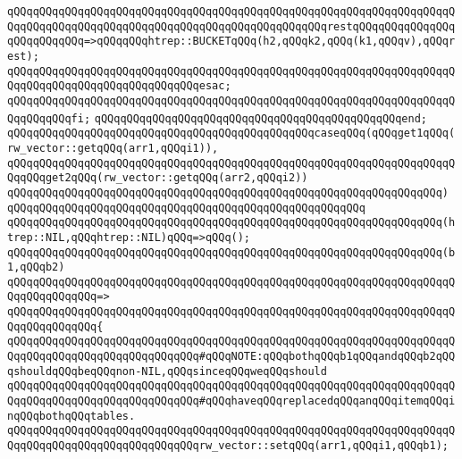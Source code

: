 \verb|qQQqqQQqqQQqqQQqqQQqqQQqqQQqqQQqqQQqqQQqqQQqqQQqqQQqqQQqqQQqqQQqqQQqqQQqqQQqqQQqqQQqqQQqqQQqqQQqqQQqqQQqqQQqqQQqqQQqqQQqrestqQQqqQQqqQQqqQQqqQQqqQQqqQQq=>qQQqqQQqhtrep::BUCKETqQQq(h2,qQQqk2,qQQq(k1,qQQqv),qQQqrest);|\newline
\verb|qQQqqQQqqQQqqQQqqQQqqQQqqQQqqQQqqQQqqQQqqQQqqQQqqQQqqQQqqQQqqQQqqQQqqQQqqQQqqQQqqQQqqQQqqQQqqQQqqQQqesac;|\newline
\verb|qQQqqQQqqQQqqQQqqQQqqQQqqQQqqQQqqQQqqQQqqQQqqQQqqQQqqQQqqQQqqQQqqQQqqQQqqQQqqQQqfi;|\newline
\verb|qQQqqQQqqQQqqQQqqQQqqQQqqQQqqQQqqQQqqQQqqQQqqQQqend;|\newline
\newline
\verb|qQQqqQQqqQQqqQQqqQQqqQQqqQQqqQQqqQQqqQQqqQQqqQQqcaseqQQq(qQQqget1qQQq(rw_vector::getqQQq(arr1,qQQqi1)),|\newline
\verb|qQQqqQQqqQQqqQQqqQQqqQQqqQQqqQQqqQQqqQQqqQQqqQQqqQQqqQQqqQQqqQQqqQQqqQQqqQQqget2qQQq(rw_vector::getqQQq(arr2,qQQqi2))|\newline
\verb|qQQqqQQqqQQqqQQqqQQqqQQqqQQqqQQqqQQqqQQqqQQqqQQqqQQqqQQqqQQqqQQqqQQq)|\newline
\verb|qQQqqQQqqQQqqQQqqQQqqQQqqQQqqQQqqQQqqQQqqQQqqQQqqQQqqQQq|\newline
\verb|qQQqqQQqqQQqqQQqqQQqqQQqqQQqqQQqqQQqqQQqqQQqqQQqqQQqqQQqqQQqqQQqqQQq(htrep::NIL,qQQqhtrep::NIL)qQQq=>qQQq();|\newline
\newline
\verb|qQQqqQQqqQQqqQQqqQQqqQQqqQQqqQQqqQQqqQQqqQQqqQQqqQQqqQQqqQQqqQQqqQQq(b1,qQQqb2)|\newline
\verb|qQQqqQQqqQQqqQQqqQQqqQQqqQQqqQQqqQQqqQQqqQQqqQQqqQQqqQQqqQQqqQQqqQQqqQQqqQQqqQQqqQQq=>|\newline
\verb|qQQqqQQqqQQqqQQqqQQqqQQqqQQqqQQqqQQqqQQqqQQqqQQqqQQqqQQqqQQqqQQqqQQqqQQqqQQqqQQqqQQq{|\newline
\verb|qQQqqQQqqQQqqQQqqQQqqQQqqQQqqQQqqQQqqQQqqQQqqQQqqQQqqQQqqQQqqQQqqQQqqQQqqQQqqQQqqQQqqQQqqQQqqQQqqQQq#qQQqNOTE:qQQqbothqQQqb1qQQqandqQQqb2qQQqshouldqQQqbeqQQqnon-NIL,qQQqsinceqQQqweqQQqshould|\newline
\verb|qQQqqQQqqQQqqQQqqQQqqQQqqQQqqQQqqQQqqQQqqQQqqQQqqQQqqQQqqQQqqQQqqQQqqQQqqQQqqQQqqQQqqQQqqQQqqQQqqQQq#qQQqhaveqQQqreplacedqQQqanqQQqitemqQQqinqQQqbothqQQqtables.|\newline
\newline
\verb|qQQqqQQqqQQqqQQqqQQqqQQqqQQqqQQqqQQqqQQqqQQqqQQqqQQqqQQqqQQqqQQqqQQqqQQqqQQqqQQqqQQqqQQqqQQqqQQqqQQqrw_vector::setqQQq(arr1,qQQqi1,qQQqb1);|\newline
